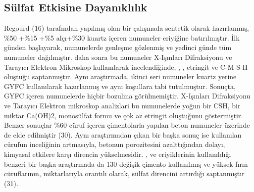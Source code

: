 \documentclass[12pt]{article}
\begin{document}
\subsection{Sülfat Etkisine Dayanıklılık}
Regourd (16) tarafından yapılmış olan bir çalışmada sentetik olarak
hazırlanmış, \%50 +\%15 +\%5 alçı+\%30 kuartz içeren numuneler %
 eriyiğine batırılmıştır. İlk günden başlayarak, numunelerde genleşme
gözlenmiş ve yedinci günde tüm numuneler dağılmıştır. daha sonra bu
numuneler X-Işınları Difraksiyonu ve Tarayıcı Elektron Mikroskop kullanılarak
incelendiğinde, , , etringit ve C-M-S-H oluştuğu
saptanmıştır. Aynı araştırmada, ikinci seri numuneler kuartz yerine GYFC
kullanılarak hazırlanmış ve aynı koşullara tabi tutulmuştur. Sonuçta, GYFC
içeren numunelerde hiçbir bozulma görülmemiştir. X-Işınları Difraksiyonu ve
Tarayıcı Elektron mikroskop analizlari bu numunelerde yoğun bir CSH, bir
miktar Ca(OH)2, monosülfat formu ve çok az etringit oluştuğunu göstermiştir.
Benzer sonuçlar \%60 cüruf içeren çimentolarla yapılan beton numuneler
üzerinde de elde edilmiştir (30). Aynı araştırmadan çıkan bir başka sonuç ise
kullanılan cürufun inceliğinin artmasıyla, betonun porozitesini azalttığından
dolayı, kimyasal etkilere karşı direncin yükselmesidir.
,  ve  eriyiklerinin kullanıldığı benzeri bir başka
araştırmada da 130 değişik çimento kullanılmış ve yüksek fırın cüruflarının,
miktarlarıyla orantılı olarak, sülfat direncini artırdığı saptanmıştır (31).
\end{document}
